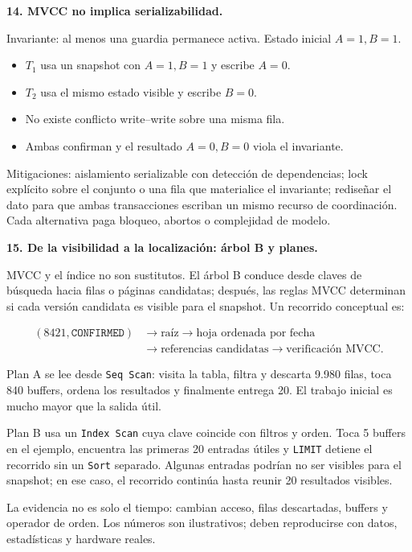 \documentclass[variant=guiaresuelta,cover=institutional,mode=screen]{ua-engineering-v6-article}
\begin{document}
\begin{uaexercise}
\textbf{14. MVCC no implica serializabilidad.}
\end{uaexercise}
\begin{uaanswer}
Invariante: al menos una guardia permanece activa. Estado inicial $A=1,B=1$.

\begin{itemize}
\item $T_1$ usa un snapshot con $A=1,B=1$ y escribe $A=0$.
\item $T_2$ usa el mismo estado visible y escribe $B=0$.
\item No existe conflicto write--write sobre una misma fila.
\item Ambas confirman y el resultado $A=0,B=0$ viola el invariante.
\end{itemize}

Mitigaciones: aislamiento serializable con detección de dependencias; lock explícito sobre el conjunto o una fila que materialice el invariante; rediseñar el dato para que ambas transacciones escriban un mismo recurso de coordinación. Cada alternativa paga bloqueo, abortos o complejidad de modelo.
\end{uaanswer}

\begin{uaexercise}
\textbf{15. De la visibilidad a la localización: árbol B y planes.}
\end{uaexercise}
\begin{uaanswer}
MVCC y el índice no son sustitutos. El árbol B conduce desde claves de búsqueda hacia filas o páginas candidatas; después, las reglas MVCC determinan si cada versión candidata es visible para el snapshot. Un recorrido conceptual es:

\[
\begin{aligned}
(8421,\texttt{CONFIRMED})
&\rightarrow \text{raíz}
\rightarrow \text{hoja ordenada por fecha}\\
&\rightarrow \text{referencias candidatas}
\rightarrow \text{verificación MVCC}.
\end{aligned}
\]

Plan A se lee desde \texttt{Seq Scan}: visita la tabla, filtra y descarta 9.980 filas, toca 840 buffers, ordena los resultados y finalmente entrega 20. El trabajo inicial es mucho mayor que la salida útil.

Plan B usa un \texttt{Index Scan} cuya clave coincide con filtros y orden. Toca 5 buffers en el ejemplo, encuentra las primeras 20 entradas útiles y \texttt{LIMIT} detiene el recorrido sin un \texttt{Sort} separado. Algunas entradas podrían no ser visibles para el snapshot; en ese caso, el recorrido continúa hasta reunir 20 resultados visibles.

La evidencia no es solo el tiempo: cambian acceso, filas descartadas, buffers y operador de orden. Los números son ilustrativos; deben reproducirse con datos, estadísticas y hardware reales.
\end{uaanswer}
\end{document}
